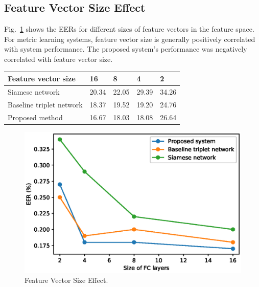 \subsection{Feature Vector Size Effect}
Fig.~\ref{fclayer} shows the EERs for different sizes of feature vectors in the feature space. 
For metric learning systems, feature vector size is generally positively correlated with system performance.
The proposed system's performance was negatively correlated with feature vector size.
\begin{table}[]
    \centering
    \begin{tabular}{|l|l|l|l|l|}
    \hline
    Feature vector size        & 16    & 8     & 4     & 2     \\ \hline
    Siamese network            & 20.34 & 22.05 & 29.39 & 34.26 \\ \hline
    Baseline triplet network   & 18.37 & 19.52 & 19.20 & 24.76 \\ \hline
    Proposed method            & 16.67 & 18.03 & 18.08 & 26.64 \\ \hline
    \end{tabular}
\end{table}
\begin{figure}[!ht]
    \includegraphics[width=\textwidth]{fclayer_v1.eps}
    \caption{Feature Vector Size Effect.} \label{fclayer}
\end{figure}
\iffalse
